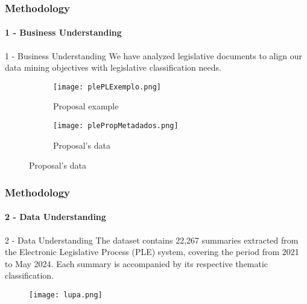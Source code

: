 \begin{frame}
	\frametitle{Methodology}
	\framesubtitle{1 - Business Understanding}	
	
	\begin{block}{1 - Business Understanding} 
			We have analyzed legislative documents to align our data mining objectives with legislative classification needs.
	\end{block}


	

	\begin{figure}
		\centering
		\begin{subfigure}[b]{0.4\textwidth}
			\texttt{[image: plePLExemplo.png]}
			\caption{Proposal example}
		\end{subfigure}
		\hspace{0.1\textwidth}
		\begin{subfigure}[b]{0.4\textwidth}
			\texttt{[image: plePropMetadados.png]}
			\caption{Proposal's data}
		\end{subfigure}
	\end{figure}

\end{frame}
\begin{frame}
	\frametitle{Methodology}
	\framesubtitle{2 - Data Understanding}	
	\begin{block}{2 - Data Understanding} 
		The dataset contains 22,267 summaries extracted from the Electronic Legislative Process (PLE) system, covering the period from 2021 to May 2024. Each summary is accompanied by its respective thematic classification.
	\end{block}

	\begin{figure}
		\texttt{[image: lupa.png]}
	\end{figure}



\end{frame}
